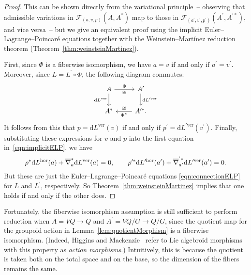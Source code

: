 \documentclass[10pt,a4paper]{amsart}
\numberwithin{equation}{section}
\begin{document}
\begin{proof}
This can be shown directly from the variational principle~-- observing that admissible variations in $ \mathcal{F} _{ ( a, v, p ) } ( A , A ^\ast ) $ map to those in $ \mathcal{F} _{ ( a ^\prime , v ^\prime , p ^\prime ) } ( A ^\prime , A ^{ \prime \ast } ) $, and vice versa~-- but we give an equivalent proof using the implicit Euler--Lagrange--Poincar\'e equations together with the Weinstein--Mart\'inez reduction theorem (Theorem~\ref{thm:weinsteinMartinez}).

First, since $ \Phi $ is a f\/iberwise isomorphism, we have $ a = v $ if and only if $ a ^\prime = v ^\prime $. Moreover, since $ L = L ^\prime \circ \Phi $, the following diagram commutes:
 \begin{equation*}
 \begin{tikzcd}
 A \ar[r, "\Phi", "\cong"'] \ar[d, "\mathrm{d} L ^\text{ver}"'] &
 A ^\prime \ar[d, "\mathrm{d} L ^{\prime \text{ver}}"]\\
 A ^\ast & \ar[l, "\Phi ^\ast ", "\cong"'] A ^{ \prime \ast }.
 \end{tikzcd}
 \end{equation*}
 It follows from this that $ p = \mathrm{d} L ^\text{ver} (v) $ if and only if $ p ^\prime = \mathrm{d} L ^{ \prime \text{ver}} ( v ^\prime ) $. Finally, substituting these expressions for $v$ and $p$ into the f\/irst equation in~\eqref{eqn:implicitELP}, we have
 \begin{gather*}
 \rho ^\ast \mathrm{d} L ^\textup{hor} (a) + \overline{ \nabla }_a ^\ast \mathrm{d} L ^\textup{ver} (a) = 0 , \qquad \rho ^{\prime \ast} \mathrm{d} L ^{\prime \textup{hor}} (a ^\prime ) + \overline{ \nabla } _{a ^\prime } ^{^\prime \ast} \mathrm{d} L ^{\prime \textup{ver}} (a ^\prime ) = 0 .
 \end{gather*}
But these are just the Euler--Lagrange--Poincar\'e equations \eqref{eqn:connectionELP} for $L$ and $ L ^\prime $, respectively. So Theorem~\ref{thm:weinsteinMartinez} implies that one holds if and only if the other does.
\end{proof}


Fortunately, the f\/iberwise isomorphism assumption is still suf\/f\/icient to perform reduction when $ A = V Q \rightarrow Q $ and $ A ^\prime = V Q / G \rightarrow Q / G $, since the quotient map for the groupoid action in Lemma~\ref{lem:quotientMorphism} is a f\/iberwise isomorphism. (Indeed, Higgins and Mackenzie~\cite{HiMa1993} refer to Lie algebroid morphisms with this property as \emph{action morphisms}.) Intuitively, this is because the quotient is taken both on the total space and on the base, so the dimension of the f\/ibers remains the same.
\end{document}
